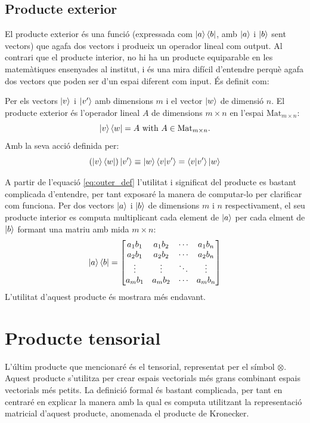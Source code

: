 \subsection{Producte exterior}
El producte exterior és una funció (expressada com $\ket{a}\bra{b}$, amb $\ket{a}$ i $\ket{b}$ sent vectors) que agafa dos vectors i produeix un operador lineal com output. Al contrari que el producte interior, no hi ha un producte equiparable en les matemàtiques ensenyades al institut, i és una mira difícil d'entendre perquè agafa dos vectors que poden ser d'un espai diferent com input.
És definit com: 

Per els vectors $\ket{v}$ i $\ket{v'}$ amb dimensions $m$ i el vector $\ket{w}$ de dimensió $n$. El producte exterior és l'operador lineal $A$ de dimensions $m \times n$ en l'espai $\mathrm{Mat}_{m\times n}$:
$$
\ket{v}\bra{w} = A \text{ with } A\in \mathrm{Mat}_{m\times n} .
$$ 
Amb la seva acció definida per: 
\begin{equation}
	(\ket{v}\bra{w})\ket{v'} \equiv \ket{w}\bra{v}\ket{v'} = \bra{v}\ket{v'}\ket{w}
	\label{eq:outer_def}
\end{equation}

A partir de l'equació \eqref{eq:outer_def} l'utilitat i significat del producte es bastant complicada d'entendre, per tant exposaré la manera de computar-lo per clarificar com funciona. Per dos vectors $\ket{a}$ i $\ket{b}$ de dimensions $m$ i $n$ respectivament, el seu producte interior es computa multiplicant cada element de $\ket{a}$ per cada elment de $\ket{b}$ formant una matriu amb mida $m\times n$:
$$
\ket{a}\bra{b} = \begin{bmatrix}
	a_1 b_1 & a_1 b_2 & \cdots & a_1 b_n \\
	a_2 b_1 & a_2 b_2 & \cdots & a_2 b_n \\
	\vdots  & \vdots  & \ddots& \vdots  \\
	a_m b_1 & a_m b_2 & \cdots & a_m b_n \\
\end{bmatrix}
$$
L'utilitat d'aquest producte és mostrara més endavant.

\section{Producte tensorial}
L'últim producte que mencionaré és el tensorial, representat per el símbol $\otimes$. Aquest producte s'utilitza per crear espais vectorials més grans combinant espais vectorials més petits. La definició formal és bastant complicada, per tant en centraré en explicar la manera amb la qual es computa utilitzant la representació matricial d'aquest producte, anomenada el producte de Kronecker. 

